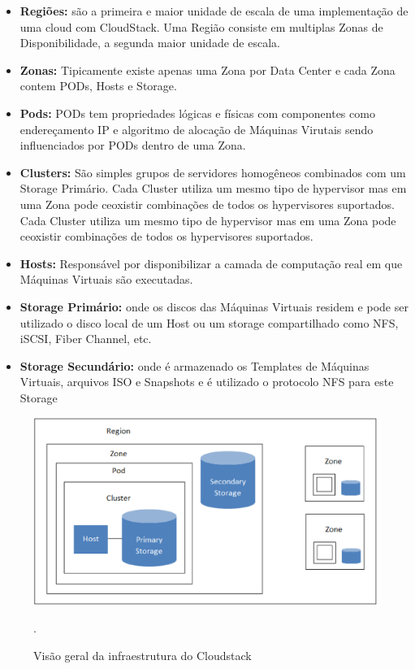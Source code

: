 \begin{itemize}
\item \textbf{Regiões:} são a primeira e maior unidade de escala de uma implementação de uma cloud com CloudStack. Uma Região consiste em multiplas Zonas de Disponibilidade, a segunda maior unidade de escala.
\item \textbf{Zonas: } Tipicamente existe apenas uma Zona por Data Center e cada Zona contem PODs, Hosts e Storage.
\item \textbf{Pods: } PODs tem propriedades lógicas e físicas com componentes como endereçamento IP e algoritmo de alocação de Máquinas Virutais sendo influenciados por PODs dentro de uma Zona.
\item \textbf{Clusters: } São simples grupos de servidores homogêneos combinados com um Storage Primário. Cada Cluster utiliza um mesmo tipo de hypervisor mas em uma Zona pode ceoxistir combinações de todos os hypervisores suportados. Cada Cluster utiliza um mesmo tipo de hypervisor mas em uma Zona pode ceoxistir combinações de todos os hypervisores suportados.
\item \textbf{Hosts: } Responsável por disponibilizar a camada de computação real em que Máquinas Virtuais são executadas.
\item \textbf{Storage Primário: }  onde os discos das Máquinas Virtuais residem e pode ser utilizado o disco local de um Host ou um storage compartilhado como NFS, iSCSI, Fiber Channel, etc.
\item \textbf{Storage Secundário:} onde é armazenado os Templates de Máquinas Virtuais, arquivos ISO e Snapshots e é utilizado o protocolo NFS para este Storage
\end{itemize}


\begin{figure}[!htb]
\centering
\includegraphics [keepaspectratio=true,scale=0.60]{figuras/cloudstack_structure.eps}
\caption{Visão geral da infraestrutura do Cloudstack}
\cite{cloudstack}.
\label{diagramacloudstack}
\end{figure}

